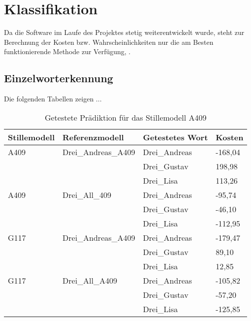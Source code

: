 \section{Klassifikation}

Da die Software im Laufe des Projektes stetig weiterentwickelt wurde, steht zur Berechnung der Kosten bzw. Wahrscheinlichkeiten nur die am Besten funktionierende Methode zur Verfügung, .


\subsection{Einzelworterkennung}

Die folgenden Tabellen zeigen ...


\begin{table}[!hp]
\centering
\begin{tabular}{|l|l|l|l|}
\hline
Stillemodell 			& Referenzmodell 	  & Getestetes Wort 	& Kosten \\ \hline \hline
\rowcolor{green!50} A409& Drei\_Andreas\_A409 & Drei\_Andreas 	& -168,04 \\ \cline{3-4}
						&				 	  & Drei\_Gustav  	&  198,98 \\ \cline{3-4}
						&					  & Drei\_Lisa	  	&  113,26 \\ \hline \hline
A409					& Drei\_All\_409	  & Drei\_Andreas 	& -95,74 \\ \cline{3-4}
						&				 	  & Drei\_Gustav  	& -46,10 \\ \cline{3-4}
\rowcolor{green!50}		&					  & Drei\_Lisa	  	& -112,95 \\ \hline \hline
\rowcolor{green!50} G117& Drei\_Andreas\_A409 & Drei\_Andreas 	& -179,47 \\ \cline{3-4}
						&				 	  & Drei\_Gustav  	& 89,10\\ \cline{3-4}
						&					  & Drei\_Lisa	  	& 12,85 \\ \hline \hline
G117					& Drei\_All\_A409	  & Drei\_Andreas 	& -105,82 \\ \cline{3-4}
						&				 	  & Drei\_Gustav  	& -57,20 \\ \cline{3-4}
\rowcolor{green!50}		&					  & Drei\_Lisa	  	& -125,85  \\ \hline \hline
\end{tabular}
\caption[Getestete Prädiktion für das Stillemodell A409]{Getestete Prädiktion für das Stillemodell A409}
\label{tab:predict_G117}
\end{table}


